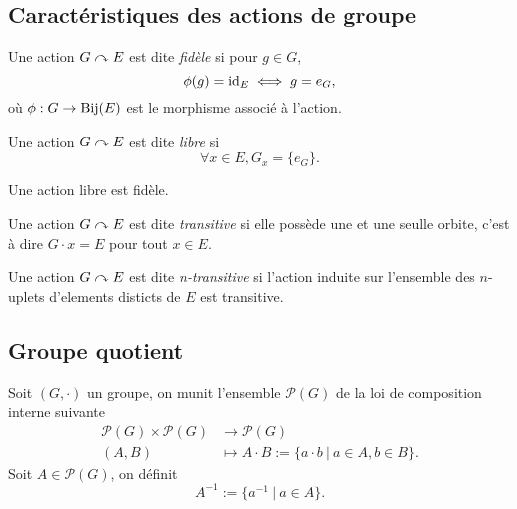 \subsection{Caractéristiques des actions de groupe}

\begin{definition}
	Une action $G \curvearrowright E$ est dite \emph{fidèle} si pour $g \in G$,
	\begin{equation*}
		\phi(g) = \operatorname{id}_E \iff g = e_G,
	\end{equation*}
	où $\phi : G \to \operatorname{Bij}(E)$ est le morphisme associé à l'action.
\end{definition}

\begin{definition}
	Une action $G \curvearrowright E$ est dite \emph{libre} si
	\begin{equation*}
		\forall x \in E, G_x = \{e_G\}.
	\end{equation*}
\end{definition}

\begin{remark}
	Une action libre est fidèle.	
\end{remark}

\begin{definition}
	Une action $G \curvearrowright E$ est dite \emph{transitive} si elle
	possède une et une seulle orbite, c'est à dire $G \cdot x = E$ pour tout $x \in E$.
\end{definition}

\begin{definition}
	Une action $G \curvearrowright E$ est dite \emph{n-transitive} si l'action induite sur
	l'ensemble des $n$-uplets d'elements disticts de $E$ est transitive.
\end{definition}

\subsection{Groupe quotient}

Soit $(G, \cdot)$ un groupe, on munit l'ensemble $\mathcal{P}(G)$
de la loi de composition interne suivante
\begin{align*}
	\mathcal{P}(G) \times \mathcal{P}(G) &\to \mathcal{P}(G)\\
	(A, B) &\mapsto A \cdot B := \{a \cdot b\ |\ a \in A, b \in B\}.
\end{align*}
Soit $A \in \mathcal{P}(G)$, on définit
\begin{equation*}
	A^{-1} := \{a^{-1}\ |\ a \in A\}.
\end{equation*}

